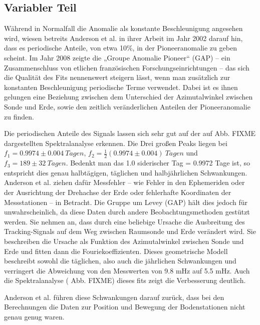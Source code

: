 
\subsection{Variabler Teil}
Während in Normalfall die Anomalie als konstante Beschleunigung angesehen wird, wiesen betreits Anderson et al. in
ihrer Arbeit im Jahr 2002 darauf hin, dass es periodische Anteile, von etwa 10\%, in der Pioneeranomalie zu
geben scheint. Im Jahr 2008
zeigte die „Groupe Anomalie Pioneer“ (GAP) – ein Zusammenschluss von etlichen französischen Forschungseinrichtungen –
das sich die Qualität des Fits nennenswert steigern lässt, wenn man zusätzlich zur konstanten Beschleunigung
periodische Terme verwendet.
Dabei ist es ihnen gelungen eine Beziehung zwischen dem Unterschied der Azimutalwinkel zwischen Sonde und Erde, sowie
den zeitlich veränderlichen Anteilen der Pioneeranomalie zu finden. %

Die periodischen Anteile des Signals lassen sich sehr gut auf der auf Abb. FIXME dargestellten Spektralanalyse
erkennen. Die Drei großen Peaks liegen bei $f_1=0.9974\pm0.004\ Tagen$, $f_2=\frac12(0.9974\pm0.004)\ Tagen$ und 
$f_3=189\pm32\ Tagen$. Bedenkt man das 1.0 siderischer Tag = 0.9972 Tage ist, so entspricht dies genau
halbtägigen, täglichen und halbjährlichen Schwankungen. Anderson et al. ziehen dafür Messfehler – wie Fehler in den
Ephemeriden oder der Ausrichtung der Drehachse der Erde oder fehlerhafte Koordinaten der Messstationen – in Betracht.
Die Gruppe um Levey (GAP) hält dies jedoch für unwahrscheinlich, da diese Daten durch andere Beobachtungsmethoden
gestützt werden.
Sie nehmen an, dass durch eine beliebige Ursache die Ausbreitung des Tracking-Signals auf dem Weg zwischen Raumsonde und
Erde verändert wird. Sie beschreiben die Ursache als Funktion des Azimutalwinkel zwischen Sonde und Erde und fitten
dann die Fouriekoeffizienten. Dieses geometrische Modell beschreibt sowohl die täglichen, also auch die jährlichen
Schwankungen und verringert die Abweichung von den Messwerten von 9.8 mHz auf 5.5 mHz. Auch die Spektralanalyse (
Abb. FIXME) dieses fits zeigt die Verbesserung deutlich.\cite{Levy2008} %

Anderson et al. führen diese Schwankungen darauf zurück, dass bei den Berechnungen die Daten zur Position und Bewegung
der Bodenstationen nicht genau genug waren.\cite{Dittus2006} %